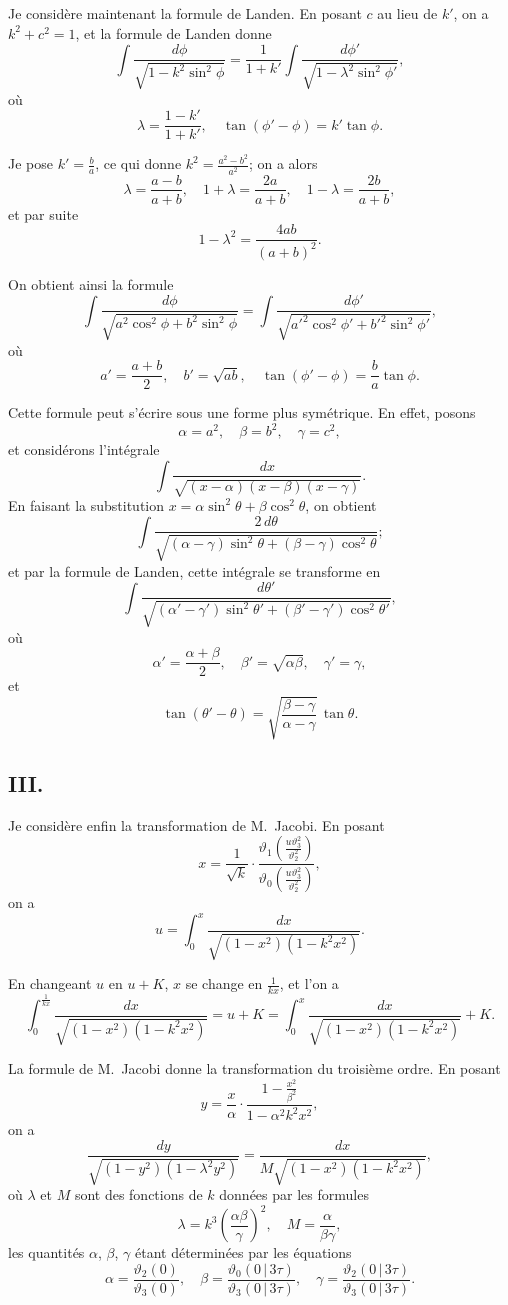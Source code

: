 \documentclass[11pt,a4paper]{book}
\begin{document}
Je considère maintenant la formule de Landen. En posant $c$ au lieu de $k'$, on a $k^2+c^2=1$, et la formule de Landen donne
\[
\int \frac{d\phi}{\sqrt{1-k^2\sin^2\phi}}
= \frac{1}{1+k'} \int \frac{d\phi'}{\sqrt{1-\lambda^2\sin^2\phi'}},
\]
où
\[
\lambda = \frac{1-k'}{1+k'}, \quad \tan(\phi'-\phi) = k'\tan\phi.
\]

Je pose $k' = \frac{b}{a}$, ce qui donne $k^2 = \frac{a^2-b^2}{a^2}$; on a alors
\[
\lambda = \frac{a-b}{a+b}, \quad 1+\lambda = \frac{2a}{a+b}, \quad 1-\lambda = \frac{2b}{a+b},
\]
et par suite
\[
1-\lambda^2 = \frac{4ab}{(a+b)^2}.
\]

On obtient ainsi la formule
\[
\int \frac{d\phi}{\sqrt{a^2\cos^2\phi+b^2\sin^2\phi}}
= \int \frac{d\phi'}{\sqrt{a'^2\cos^2\phi'+b'^2\sin^2\phi'}},
\]
où
\[
a' = \frac{a+b}{2}, \quad b' = \sqrt{ab}, \quad \tan(\phi'-\phi) = \frac{b}{a}\tan\phi.
\]

\setcounter{page}{65}

Cette formule peut s'écrire sous une forme plus symétrique. En effet, posons
\[
\alpha = a^2, \quad \beta = b^2, \quad \gamma = c^2,
\]
et considérons l'intégrale
\[
\int \frac{dx}{\sqrt{(x-\alpha)(x-\beta)(x-\gamma)}}.
\]
En faisant la substitution $x = \alpha\sin^2\theta + \beta\cos^2\theta$, on obtient
\[
\int \frac{2\,d\theta}{\sqrt{(\alpha-\gamma)\sin^2\theta+(\beta-\gamma)\cos^2\theta}};
\]
et par la formule de Landen, cette intégrale se transforme en
\[
\int \frac{d\theta'}{\sqrt{(\alpha'-\gamma')\sin^2\theta'+(\beta'-\gamma')\cos^2\theta'}},
\]
où
\[
\alpha' = \frac{\alpha+\beta}{2}, \quad \beta' = \sqrt{\alpha\beta}, \quad \gamma' = \gamma,
\]
et
\[
\tan(\theta'-\theta) = \sqrt{\frac{\beta-\gamma}{\alpha-\gamma}}\,\tan\theta.
\]

\setcounter{page}{66}

\subsection*{III.}

Je considère enfin la transformation de M.~Jacobi. En posant
\[
x = \frac{1}{\sqrt{k}} \cdot \frac{\vartheta_1(\frac{u\vartheta_3^2}{\vartheta_2^2})}{\vartheta_0(\frac{u\vartheta_3^2}{\vartheta_2^2})},
\]
on a
\[
u = \int_0^x \frac{dx}{\sqrt{(1-x^2)(1-k^2x^2)}}.
\]

En changeant $u$ en $u+K$, $x$ se change en $\frac{1}{kx}$, et l'on a
\[
\int_0^{\frac{1}{kx}} \frac{dx}{\sqrt{(1-x^2)(1-k^2x^2)}}
= u + K = \int_0^x \frac{dx}{\sqrt{(1-x^2)(1-k^2x^2)}} + K.
\]

La formule de M.~Jacobi donne la transformation du troisième ordre. En posant
\[
y = \frac{x}{\alpha} \cdot \frac{1-\frac{x^2}{\beta^2}}{1-\alpha^2 k^2 x^2},
\]
on a
\[
\frac{dy}{\sqrt{(1-y^2)(1-\lambda^2y^2)}}
= \frac{dx}{M\sqrt{(1-x^2)(1-k^2x^2)}},
\]
où $\lambda$ et $M$ sont des fonctions de $k$ données par les formules
\[
\lambda = k^3 \left(\frac{\alpha\beta}{\gamma}\right)^2, \quad M = \frac{\alpha}{\beta\gamma},
\]
les quantités $\alpha$, $\beta$, $\gamma$ étant déterminées par les équations
\[
\alpha = \frac{\vartheta_2(0)}{\vartheta_3(0)}, \quad
\beta = \frac{\vartheta_0(0\,|\,3\tau)}{\vartheta_3(0\,|\,3\tau)}, \quad
\gamma = \frac{\vartheta_2(0\,|\,3\tau)}{\vartheta_3(0\,|\,3\tau)}.
\]
\end{document}
